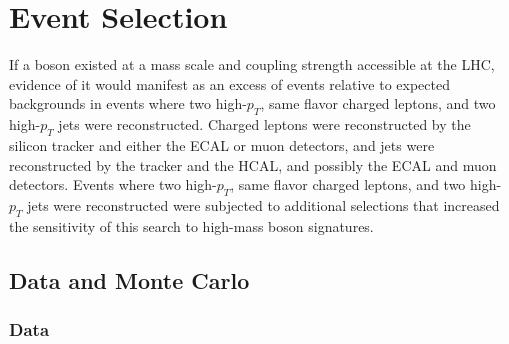 \chapter{Event Selection}
\label{sec:event_selection_chapter}

If a \WR boson existed at a mass scale and coupling strength accessible at the LHC, evidence 
of it would manifest as an excess of events relative to expected backgrounds in events 
where two high-$p_{T}$, same flavor charged leptons, and two high-$p_{T}$ jets were reconstructed.  
Charged leptons were reconstructed by the silicon tracker and either the ECAL or muon detectors, 
and jets were reconstructed by the tracker and the HCAL, and possibly the ECAL and muon 
detectors.  Events where two high-$p_{T}$, same flavor charged leptons, and two high-$p_{T}$ 
jets were reconstructed were subjected to additional selections that increased the sensitivity 
of this search to high-mass \WR boson signatures.


\section{Data and Monte Carlo}

\subsection{Data}
\label{dataAndTriggers}

